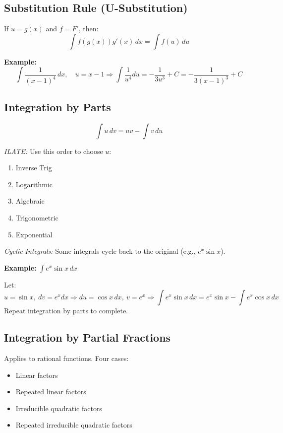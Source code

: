 \subsection{Substitution Rule (U-Substitution)}

If \(u = g(x)\) and \(f = F'\), then:
\[
\int f(g(x))g'(x)\,dx = \int f(u)\,du
\]

\textbf{Example:}
\[
\int \frac{1}{{(x - 1)}^4}\,dx, \quad u = x - 1 \Rightarrow \int \frac{1}{u^4} du = -\frac{1}{3u^3} + C = -\frac{1}{3{(x - 1)}^3} + C
\]

\subsection{Integration by Parts}

\[
\int u\,dv = uv - \int v\,du
\]

\emph{ILATE:} Use this order to choose \(u\):
\begin{enumerate}
    \item Inverse Trig
    \item Logarithmic
    \item Algebraic
    \item Trigonometric
    \item Exponential
\end{enumerate}

\emph{Cyclic Integrals:} Some integrals cycle back to the original (e.g., \(e^x \sin x\)).

\textbf{Example:} \(\int e^x \sin x\,dx\)

Let:
\[
u = \sin x,\ dv = e^x dx \Rightarrow du = \cos x\,dx,\ v = e^x
\Rightarrow \int e^x \sin x\,dx = e^x \sin x - \int e^x \cos x\,dx
\]
Repeat integration by parts to complete.

\subsection{Integration by Partial Fractions}

Applies to rational functions. Four cases:

\begin{itemize}[label=\(-\)]
\item Linear factors
\item Repeated linear factors
\item Irreducible quadratic factors
\item Repeated irreducible quadratic factors
\end{itemize}

